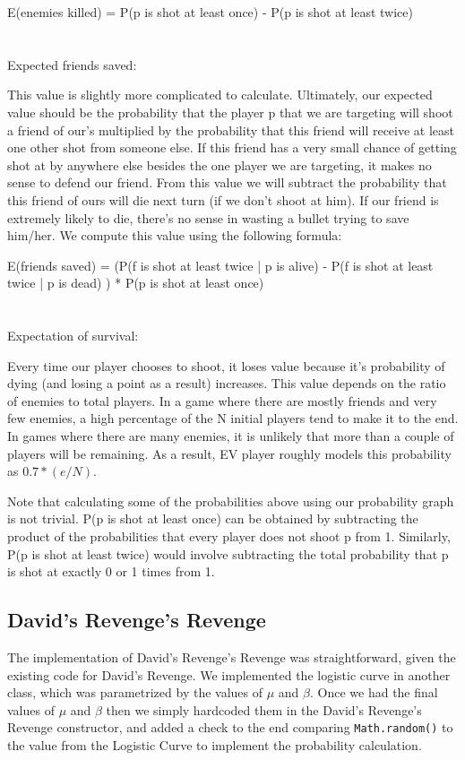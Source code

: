 \documentclass[
10pt, %
letterpaper, %
oneside, %
headinclude,footinclude, %
english
]{article}
\begin{document}
E(enemies killed) = P(p is shot at least once) - P(p is shot at least twice) 
\\
\\
\\
Expected friends saved:

This value is slightly more complicated to calculate. Ultimately, our expected value should be the probability that the player p that we are targeting will shoot a friend of our’s multiplied by the probability that this friend will receive at least one other shot from someone else. If this friend has a very small chance of getting shot at by anywhere else besides the one player we are targeting, it makes no sense to defend our friend. From this value we will subtract the probability that this friend of ours will die next turn (if we don’t shoot at him). If our friend is extremely likely to die, there’s no sense in wasting a bullet trying to save him/her. We compute this value using the following formula:

E(friends saved) = (P(f is shot at least twice | p is alive) - P(f is shot at least twice | p is dead) ) * P(p is shot at least once)
\\
\\
\\

Expectation of survival:

Every time our player chooses to shoot, it loses value because it’s probability of dying (and losing a point as a result) increases. This value depends on the ratio of enemies to total players. In a game where there are mostly friends and very few enemies, a high percentage of the N initial players tend to make it to the end. In games where there are many enemies, it is unlikely that more than a couple of players will be remaining. As a result, EV player roughly models this probability as $0.7 * (e/N)$.

Note that calculating some of the probabilities above using our probability graph is not trivial. P(p is shot at least once) can be obtained by subtracting the product of the probabilities that every player does not shoot p from 1. Similarly, P(p is shot at least twice) would involve subtracting the total probability that p is shot at exactly 0 or 1 times from 1. 
\subsection{David's Revenge's Revenge}

The implementation of David's Revenge's Revenge was straightforward, given the existing code for David's Revenge. We implemented the logistic curve in another class, which was parametrized by the values of $\mu$ and $\beta$. Once we had the final values of $\mu$ and $\beta$ then we simply hardcoded them in the David's Revenge's Revenge constructor, and added a check to the end comparing \texttt{Math.random()} to the value from the Logistic Curve to implement the probability calculation.
\end{document}
